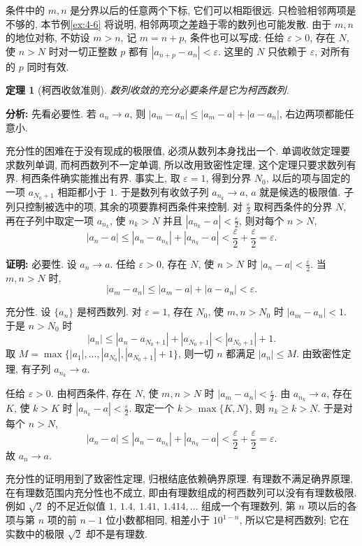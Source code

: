 \documentclass[UTF8,openany]{ctexbook}
\theoremstyle{chinesetextbook}
\newtheorem{theorem}{定理}[section]
\newenvironment{cnproof}{\par\indent\textbf{证明:} \ignorespaces}{\par}
\begin{document}
条件中的 $m,n$ 是分界以后的任意两个下标, 它们可以相距很远. 只检验相邻两项是不够的, 本节例\ref{ex:4-6} 将说明, 相邻两项之差趋于零的数列也可能发散. 由于 $m,n$ 的地位对称, 不妨设 $m>n$, 记 $m=n+p$, 条件也可以写成: 任给 $\varepsilon>0$, 存在 $N$, 使 $n>N$ 时对一切正整数 $p$ 都有 $|a_{n+p}-a_n|<\varepsilon$. 这里的 $N$ 只依赖于 $\varepsilon$, 对所有的 $p$ 同时有效.
\begin{theorem}[柯西收敛准则]
数列收敛的充分必要条件是它为柯西数列.
\end{theorem}
\par\indent\textbf{分析:} 先看必要性. 若 $a_n\to a$, 则 $|a_m-a_n|\le|a_m-a|+|a-a_n|$, 右边两项都能任意小.

充分性的困难在于没有现成的极限值, 必须从数列本身找出一个. 单调收敛定理要求数列单调, 而柯西数列不一定单调, 所以改用致密性定理, 这个定理只要求数列有界. 柯西条件确实能推出有界. 事实上, 取 $\varepsilon=1$, 得到分界 $N_0$, 以后的项与固定的一项 $a_{N_0+1}$ 相距都小于 $1$. 于是数列有收敛子列 $a_{n_k}\to a$, $a$ 就是候选的极限值. 子列只控制被选中的项, 其余的项要靠柯西条件来控制. 对 $\displaystyle\frac\varepsilon2$ 取柯西条件的分界 $N$, 再在子列中取定一项 $a_{n_k}$, 使 $n_k>N$ 并且 $\displaystyle|a_{n_k}-a|<\frac\varepsilon2$, 则对每个 $n>N$,
\[
|a_n-a|\le|a_n-a_{n_k}|+|a_{n_k}-a|<\frac\varepsilon2+\frac\varepsilon2=\varepsilon.
\]
\begin{cnproof}
必要性. 设 $a_n\to a$. 任给 $\varepsilon>0$, 存在 $N$, 使 $n>N$ 时 $\displaystyle|a_n-a|<\frac\varepsilon2$. 当 $m,n>N$ 时,
\[
|a_m-a_n|\le|a_m-a|+|a-a_n|<\varepsilon.
\]

充分性. 设 $\{a_n\}$ 是柯西数列. 对 $\varepsilon=1$, 存在 $N_0$, 使 $m,n>N_0$ 时 $|a_m-a_n|<1$. 于是 $n>N_0$ 时
\[
|a_n|\le|a_n-a_{N_0+1}|+|a_{N_0+1}|<|a_{N_0+1}|+1.
\]
取 $M=\max\{|a_1|,\ldots,|a_{N_0}|,|a_{N_0+1}|+1\}$, 则一切 $n$ 都满足 $|a_n|\le M$. 由致密性定理, 有子列 $a_{n_k}\to a$.

任给 $\varepsilon>0$. 由柯西条件, 存在 $N$, 使 $m,n>N$ 时 $\displaystyle|a_m-a_n|<\frac\varepsilon2$. 由 $a_{n_k}\to a$, 存在 $K$, 使 $k>K$ 时 $\displaystyle|a_{n_k}-a|<\frac\varepsilon2$. 取定一个 $k>\max\{K,N\}$, 则 $n_k\ge k>N$. 于是对每个 $n>N$,
\[
|a_n-a|\le|a_n-a_{n_k}|+|a_{n_k}-a|<\frac\varepsilon2+\frac\varepsilon2=\varepsilon.
\]
故 $a_n\to a$.
\end{cnproof}
充分性的证明用到了致密性定理, 归根结底依赖确界原理. 有理数不满足确界原理, 在有理数范围内充分性也不成立, 即由有理数组成的柯西数列可以没有有理数极限. 例如 $\sqrt2$ 的不足近似值 $1,\ 1.4,\ 1.41,\ 1.414,\ldots$ 组成一个有理数列, 第 $n$ 项以后的各项与第 $n$ 项的前 $n-1$ 位小数都相同, 相差小于 $10^{1-n}$, 所以它是柯西数列; 它在实数中的极限 $\sqrt2$ 却不是有理数.
\end{document}
